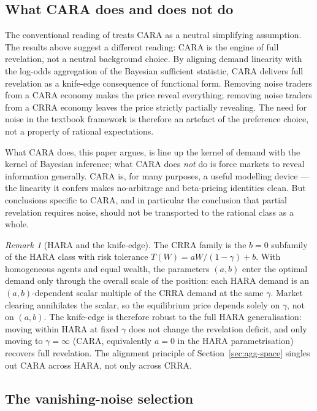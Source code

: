 \documentclass[12pt,letterpaper]{article}
\theoremstyle{definition}
\theoremstyle{remark}
\newtheorem{remark}{Remark}
\newcommand{\1}{\mathbf{1}}
\begin{document}
\subsection{What CARA does and does not do}

The conventional reading of \citet{GrossmanStiglitz1980} treats CARA as a
neutral simplifying assumption. The results above suggest a different
reading: CARA is the engine of full revelation, not a neutral background
choice. By aligning demand linearity with the log-odds aggregation of the
Bayesian sufficient statistic, CARA delivers full revelation as a
knife-edge consequence of functional form. Removing noise traders from a
CARA economy makes the price reveal everything; removing noise traders
from a CRRA economy leaves the price strictly partially revealing. The
need for noise in the textbook framework is therefore an artefact of the
preference choice, not a property of rational expectations.

What CARA does, this paper argues, is line up the kernel of demand with
the kernel of Bayesian inference; what CARA does \emph{not} do is force
markets to reveal information generally. CARA is, for many purposes, a
useful modelling device --- the linearity it confers makes
no-arbitrage and beta-pricing identities clean. But conclusions specific
to CARA, and in particular the conclusion that partial revelation
requires noise, should not be transported to the rational class as a
whole.

\begin{remark}[HARA and the knife-edge]\label{rem:hara}
The CRRA family is the $b=0$ subfamily of the HARA class with risk
tolerance $T(W)=aW/(1-\gamma)+b$. With homogeneous agents and equal
wealth, the parameters $(a,b)$ enter the optimal demand only through the
overall scale of the position: each HARA demand is an
$(a,b)$-dependent scalar multiple of the CRRA demand at the same
$\gamma$. Market clearing annihilates the scalar, so the equilibrium
price depends solely on $\gamma$, not on $(a,b)$. The knife-edge is
therefore robust to the full HARA generalisation: moving within HARA at
fixed $\gamma$ does not change the revelation deficit, and only moving
to $\gamma=\infty$ (CARA, equivalently $a=0$ in the HARA parametrisation)
recovers full revelation. The alignment principle of
Section~\ref{sec:agg-space} singles out CARA across HARA, not only
across CRRA.
\end{remark}

\subsection{The vanishing-noise selection}\label{sec:vanishing-noise}
\end{document}
